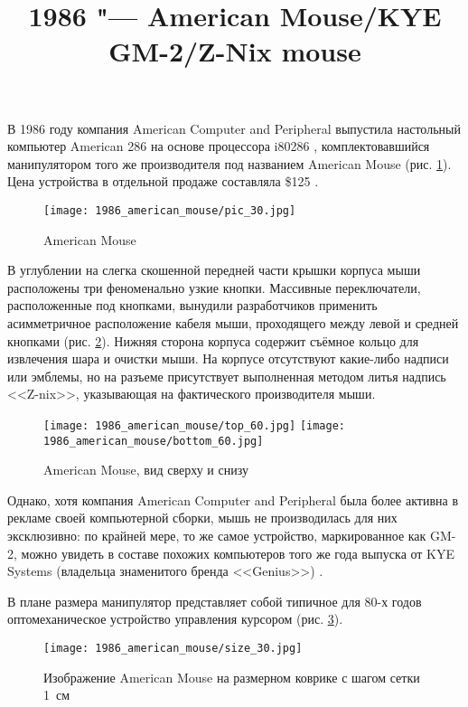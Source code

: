 \documentclass[11pt, a4paper]{article}
\begin{document}
\title{1986 "--- American Mouse/KYE GM-2/Z-Nix mouse}
\date{}
\maketitle
{}
В 1986 году компания American Computer and Peripheral выпустила настольный компьютер American 286 на основе процессора i80286 \cite{adv}, комплектовавшийся манипулятором того же производителя под названием American Mouse (рис. \ref{fig:AmericanPic}). Цена устройства в отдельной продаже составляла \$125 \cite{review}.

\begin{figure}[h]
    \centering
    \texttt{[image: 1986\_american\_mouse/pic\_30.jpg]}
    \caption{American Mouse}
    \label{fig:AmericanPic}
\end{figure}

В углублении на слегка скошенной передней части крышки корпуса мыши расположены три феноменально узкие кнопки. Массивные переключатели, расположенные под кнопками, вынудили разработчиков применить асимметричное расположение кабеля мыши, проходящего между левой и средней кнопками (рис. \ref{AmericanTopAndBottom}). Нижняя сторона корпуса содержит съёмное кольцо для извлечения шара и очистки мыши. На корпусе отсутствуют какие-либо надписи или эмблемы, но на разъеме присутствует выполненная методом литья надпись <<Z-nix>>, указывающая на фактического производителя мыши. 

\begin{figure}[h]
    \centering
    \texttt{[image: 1986\_american\_mouse/top\_60.jpg]}
    \texttt{[image: 1986\_american\_mouse/bottom\_60.jpg]}
    \caption{American Mouse, вид сверху и снизу}
    \label{AmericanTopAndBottom}
\end{figure}

Однако, хотя компания American Computer and Peripheral была более активна в рекламе своей компьютерной сборки, мышь не производилась для них эксклюзивно: по крайней мере, то же самое устройство, маркированное как GM-2, можно увидеть в составе похожих компьютеров того же года выпуска от KYE Systems (владельца знаменитого бренда <<Genius>>) \cite{kye}.

В плане размера манипулятор представляет собой типичное для 80-х годов оптомеханическое устройство управления курсором (рис. \ref{fig:AmericanSize}).

\begin{figure}[h]
    \centering
    \texttt{[image: 1986\_american\_mouse/size\_30.jpg]}
    \caption{Изображение American Mouse на размерном коврике с шагом сетки 1~см}
    \label{fig:AmericanSize}
\end{figure}
\end{document}
